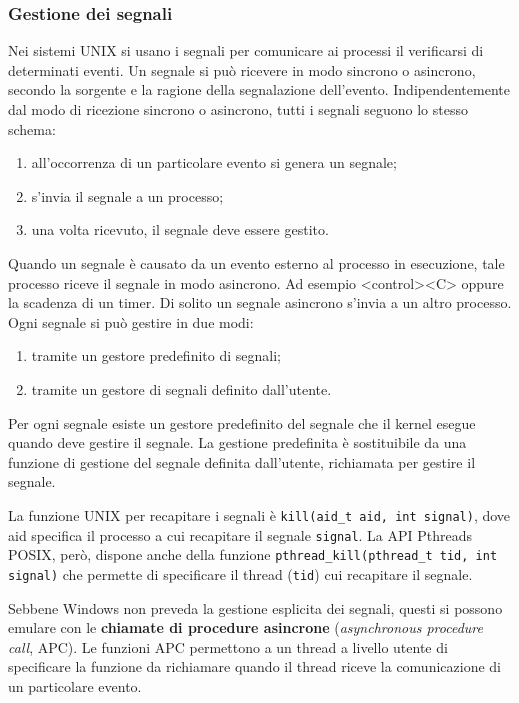 \documentclass[11pt,a4paper]{article}
\begin{document}
\subsubsection{Gestione dei segnali}
Nei sistemi UNIX si usano i segnali per comunicare ai processi il verificarsi di determinati
eventi. Un segnale si può ricevere in modo sincrono o asincrono, secondo la sorgente e la ra­gione della segnalazione dell'evento. Indipendentemente dal modo di ricezione sincrono o
asincrono, tutti i segnali seguono lo stesso schema:
\begin{enumerate}[noitemsep, leftmargin=*]
  \item all'occorrenza di un particolare evento si genera un segnale;
  \item s'invia il segnale a un processo;
  \item una volta ricevuto, il segnale deve essere gestito.
\end{enumerate}
Quando un segnale è causato da un evento esterno al processo in esecuzione, tale pro­cesso riceve il segnale in modo asincrono. Ad esempio <control><C>
oppure la scadenza di un timer. Di solito un segnale asincrono s'invia a un altro processo. Ogni segnale si può gestire in due modi:
\begin{enumerate}[noitemsep, leftmargin=*]
  \item tramite un gestore predefinito di segnali;
  \item tramite un gestore di segnali definito dall'utente.
\end{enumerate}
Per ogni segnale esiste un gestore predefinito del segnale che il kernel esegue quando deve
gestire il segnale. La gestione predefinita è sostituibile da una funzione di gestione del se­gnale definita dall'utente, richiamata per gestire il segnale.

La funzione UNIX per recapitare i segnali è \texttt{kill(aid\_t aid, int signal)}, dove aid specifica il processo a cui recapitare il segnale \texttt{signal}. La
API Pthreads POSIX, però, dispone anche della funzione \texttt{pthread\_kill(pthread\_t tid, int signal)} che permette di specificare il thread (\texttt{tid}) cui recapitare il segnale.

Sebbene Windows non preveda la gestione esplicita dei segnali, questi si possono emu­lare con le \textbf{chiamate di procedure asincrone} (\emph{asynchronous procedure call}, APC). Le funzioni
APC permettono a un thread a livello utente di specificare la funzione da richiamare quando
il thread riceve la comunicazione di un particolare evento.
\end{document}
